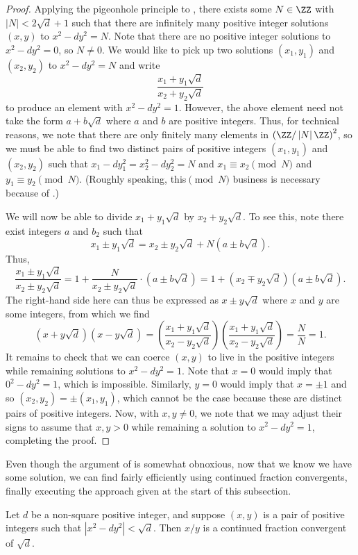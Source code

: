 \documentclass[../notes.tex]{subfiles}
\begin{document}
\begin{proof}
	Applying the pigeonhole principle to , there exists some $N\in\ZZ$ with $\left|N\right|<2\sqrt d+1$ such that there are infinitely many positive integer solutions $(x,y)$ to $x^2-dy^2=N$. Note that there are no positive integer solutions to $x^2-dy^2=0$, so $N\ne0$. We would like to pick up two solutions $(x_1,y_1)$ and $(x_2,y_2)$ to $x^2-dy^2=N$ and write
	\[\frac{x_1+y_1\sqrt d}{x_2+y_2\sqrt d}\]
	to produce an element with $x^2-dy^2=1$. However, the above element need not take the form $a+b\sqrt d$ where $a$ and $b$ are positive integers. Thus, for technical reasons, we note that there are only finitely many elements in $\left(\ZZ/\left|N\right|\ZZ\right)^2$, so we must be able to find two distinct pairs of positive integers $(x_1,y_1)$ and $(x_2,y_2)$ such that $x_1-dy_1^2=x_2^2-dy_2^2=N$ and $x_1\equiv x_2\pmod N$ and $y_1\equiv y_2\pmod N$. (Roughly speaking, this$\pmod N$ business is necessary because of .)

	We will now be able to divide $x_1+y_1\sqrt d$ by $x_2+y_2\sqrt d$. To see this, note there exist integers $a$ and $b_2$ such that
	\[x_1\pm y_1\sqrt d=x_2\pm y_2\sqrt d+N\left(a\pm b\sqrt d\right).\]
	Thus,
	\[\frac{x_1\pm y_1\sqrt d}{x_2\pm y_2\sqrt d}=1+\frac N{x_2\pm y_2\sqrt d}\cdot\left(a\pm b\sqrt d\right)=1+\left(x_2\mp y_2\sqrt d\right)\left(a\pm b\sqrt d\right).\]
	The right-hand side here can thus be expressed as $x\pm y\sqrt d$ where $x$ and $y$ are some integers, from which we find
	\[\left(x+y\sqrt d\right)\left(x-y\sqrt d\right)=\left(\frac{x_1+y_1\sqrt d}{x_2-y_2\sqrt d}\right)\left(\frac{x_1+y_1\sqrt d}{x_2-y_2\sqrt d}\right)=\frac NN=1.\]
	It remains to check that we can coerce $(x,y)$ to live in the positive integers while remaining solutions to $x^2-dy^2=1$. Note that $x=0$ would imply that $0^2-dy^2=1$, which is impossible. Similarly, $y=0$ would imply that $x=\pm1$ and so $(x_2,y_2)=\pm(x_1,y_1)$, which cannot be the case because these are distinct pairs of positive integers. Now, with $x,y\ne0$, we note that we may adjust their signs to assume that $x,y>0$ while remaining a solution to $x^2-dy^2=1$, completing the proof.
\end{proof}
Even though the argument of  is somewhat obnoxious, now that we know we have some solution, we can find fairly efficiently using continued fraction convergents, finally executing the approach given at the start of this subsection.
\begin{proposition} \label{prop:cf-for-fund-unit}
	Let $d$ be a non-square positive integer, and suppose $(x,y)$ is a pair of positive integers such that $\left|x^2-dy^2\right|<\sqrt d$. Then $x/y$ is a continued fraction convergent of $\sqrt d$. 
\end{proposition}
\end{document}
